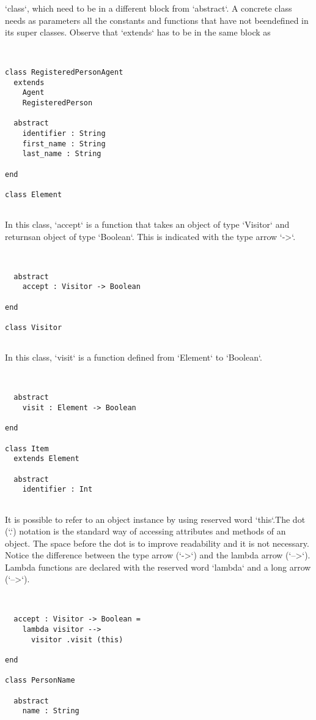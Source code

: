 \documentclass[12pt,a4paper]{article}
\begin{document}
`class`, which need to be in a different block from `abstract`. A concrete class needs as parameters all the constants and functions that have not beendefined in its super classes. Observe that `extends` has to be in the same block as


\begin{lstlisting}


class RegisteredPersonAgent
  extends
    Agent
    RegisteredPerson

  abstract
    identifier : String
    first_name : String
    last_name : String

end

class Element


\end{lstlisting}

In this class, `accept` is a function that takes an object of type `Visitor` and returnsan object of type `Boolean`. This is indicated with the type arrow `->`. 


\begin{lstlisting}


  abstract
    accept : Visitor -> Boolean

end

class Visitor


\end{lstlisting}

In this class, `visit` is a function defined from `Element` to `Boolean`. 


\begin{lstlisting}


  abstract
    visit : Element -> Boolean

end

class Item
  extends Element

  abstract
    identifier : Int


\end{lstlisting}

It is possible to refer to an object instance by using reserved word `this`.The dot (`.`) notation is the standard way of accessing attributes and methods of an
object. The space before the dot is to improve readability and it is not necessary.
Notice the difference between the type arrow (`->`) and the lambda arrow (`-->`). Lambda functions are declared with the reserved word `lambda` and a long arrow (`-->`).


\begin{lstlisting}


  accept : Visitor -> Boolean =
    lambda visitor -->
      visitor .visit (this)

end

class PersonName

  abstract
    name : String


\end{lstlisting}
\end{document}

